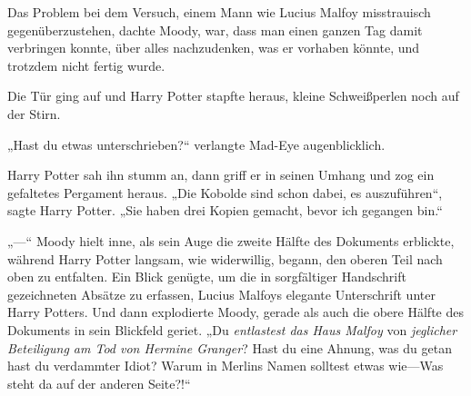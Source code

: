 Das Problem bei dem Versuch, einem Mann wie Lucius Malfoy misstrauisch gegenüberzustehen, dachte Moody, war, dass man einen ganzen Tag damit verbringen konnte, über alles nachzudenken, was er vorhaben könnte, und trotzdem nicht fertig wurde.

Die Tür ging auf und Harry Potter stapfte heraus, kleine Schweißperlen noch auf der Stirn.

„Hast du etwas unterschrieben?“ verlangte Mad-Eye augenblicklich.

Harry Potter sah ihn stumm an, dann griff er in seinen Umhang und zog ein gefaltetes Pergament heraus. „Die Kobolde sind schon dabei, es auszuführen“, sagte Harry Potter. „Sie haben drei Kopien gemacht, bevor ich gegangen bin.“

„—“
Moody hielt inne, als sein Auge die zweite Hälfte des Dokuments erblickte, während Harry Potter langsam, wie widerwillig, begann, den oberen Teil nach oben zu entfalten. Ein Blick genügte, um die in sorgfältiger Handschrift gezeichneten Absätze zu erfassen, Lucius Malfoys elegante Unterschrift unter Harry Potters. Und dann explodierte Moody, gerade als auch die obere Hälfte des Dokuments in sein Blickfeld geriet.
„Du \emph{entlastest das Haus Malfoy} von \emph{jeglicher Beteiligung am Tod von Hermine Granger}? Hast du eine Ahnung, was du getan hast du verdammter Idiot? Warum in Merlins Namen solltest etwas wie—Was steht da auf der anderen Seite?!“

